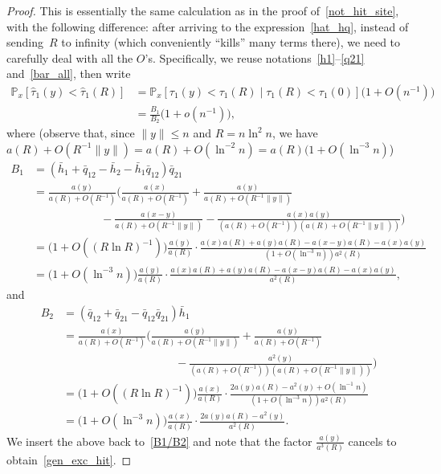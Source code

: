 \documentclass[AHL,Unicode,longabstracts]{cedram}
\newcommand{\1}[1]{{\mathbf 1}{\{#1\}}}
\newcommand{\8}{{\infty}}
\newcommand{\hh}{{\bar h}}
\newcommand{\hq}{{\bar q}}
\newcommand{\IP}{{\mathbb P}}
\newcommand{\htau}{\widehat{\tau}}
\begin{document}
\begin{proof}
This is essentially the same calculation as in the proof of~\eqref{not_hit_site}, with the following difference: after arriving to the expression~\eqref{hat_hq}, instead of sending~$R$ to infinity (which conveniently ``kills'' many terms there), we need to carefully deal with all the $O$'s. Specifically, we reuse notations~\eqref{h1}--\eqref{q21} and~\eqref{bar_all}, then write
\begin{align}
\IP_x[\htau_1(y)<\htau_1(R)] &= \IP_x[\tau_1(y)<\tau_1(R)\mid \tau_1(R)<\tau_1(0)]
\big(1+O(n^{-1})\big)\nonumber\\
&= \frac{B_1}{B_2}\big(1+o(n^{-1})\big),\label{B1/B2}
\end{align}
where (observe that, since $\|y\|\leq n$ and $R=n\ln^2 n$, we have $a(R)+O(R^{-1}\|y\|) =a(R)+O(\ln^{-2} n)=a(R)(1+O(\ln^{-3} n)$)
\begin{align*}
B_1 &= (\hh_1+\hq_{12}-\hh_2-\hh_1\hq_{12})\hq_{21}\\
&= \frac{a(y)}{a(R)+O(R^{-1})}
\Big(\frac{a(x)}{a(R)+O(R^{-1})}+\frac{a(y)}{a(R)+O(R^{-1}\|y\|)}\\
& \qquad \qquad \qquad -\frac{a(x-y)}{a(R)+O(R^{-1}\|y\|)} -\frac{a(x)a(y)}{(a(R)+O(R^{-1}))(a(R)+O(R^{-1}\|y\|))}\Big)\\
&= \big(1+O((R\ln R)^{-1})\big)
\frac{a(y)}{a(R)} \cdot
\frac{a(x)a(R)+a(y)a(R)-a(x-y)a(R)-a(x)a(y)}{(1+O(\ln^{-3} n))a^2(R)}\\
&= \big(1+O(\ln^{-3} n)\big)
\frac{a(y)}{a(R)} \cdot
\frac{a(x)a(R)+a(y)a(R)-a(x-y)a(R)-a(x)a(y)}{a^2(R)},
\end{align*}
and
\begin{align*}
B_2 &= (\hq_{12}+\hq_{21}-\hq_{12}\hq_{21})\hh_1\\
&= \frac{a(x)}{a(R)+O(R^{-1})}
\Big(\frac{a(y)}{a(R)+O(R^{-1}\|y\|)}+\frac{a(y)}{a(R)+O(R^{-1})}\\
& \qquad \qquad \qquad \qquad \qquad -\frac{a^2(y)}{(a(R)+O(R^{-1}))(a(R)+O(R^{-1}\|y\|))}\Big)\\
&=\big(1+O((R\ln R)^{-1})\big)
\frac{a(x)}{a(R)} \cdot
\frac{2a(y)a(R)-a^2(y)+O(\ln^{-1}n)}{(1+O(\ln^{-3} n))a^2(R)}\\
&= \big(1+O(\ln^{-3} n)\big)
\frac{a(x)}{a(R)} \cdot \frac{2a(y)a(R)-a^2(y)}{a^2(R)}.
\end{align*}
We insert the above back to~\eqref{B1/B2} and note that the factor $\frac{a(y)}{a^3(R)}$ cancels to obtain~\eqref{gen_exc_hit}.
\end{proof}
\end{document}
